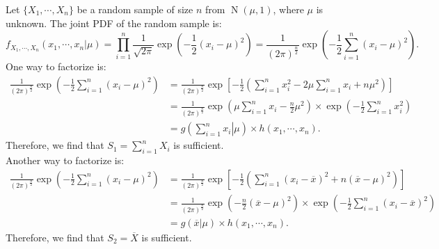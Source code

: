 \documentclass{huhtakm-template-book-v2}
\DeclareMathOperator{\N}{N}
\begin{document}
    \begin{eg}
        \label{Chapter 3 (Example) Sufficient statistic for normal distribution with unit variance}
        Let $\{X_{1}, \cdots, X_{n}\}$ be a random sample of size $n$ from $\N(\mu, 1)$, where $\mu$ is unknown. The joint PDF of the random sample is:
        \begin{equation*}
            f_{X_{1}, \cdots, X_{n}}(x_{1}, \cdots, x_{n} | \mu) = \prod_{i=1}^{n} \frac{1}{\sqrt{2\pi}} \exp\left(-\frac{1}{2}(x_{i} - \mu)^{2}\right) = \frac{1}{(2\pi)^{\frac{n}{2}}} \exp\left(-\frac{1}{2} \sum_{i=1}^{n} (x_{i} - \mu)^{2}\right).
        \end{equation*}
        One way to factorize is:
        \begin{align*}
            \frac{1}{(2\pi)^{\frac{n}{2}}} \exp\left(-\frac{1}{2} \sum_{i=1}^{n} (x_{i} - \mu)^{2}\right) &= \frac{1}{(2\pi)^{\frac{n}{2}}} \exp\left[-\frac{1}{2}\left(\sum_{i=1}^{n} x_{i}^{2} - 2\mu \sum_{i=1}^{n} x_{i} + n\mu^{2}\right)\right]\\
            &= \frac{1}{(2\pi)^{\frac{n}{2}}} \exp\left(\mu \sum_{i=1}^{n} x_{i} - \frac{n}{2}\mu^{2}\right) \times \exp\left(-\frac{1}{2} \sum_{i=1}^{n} x_{i}^{2}\right)\\
            &= g\left(\left.\sum_{i=1}^{n} x_{i}\right| \mu\right) \times h(x_{1}, \cdots, x_{n}).
        \end{align*}
        Therefore, we find that $S_{1} = \sum_{i=1}^{n} X_{i}$ is sufficient.\\
        Another way to factorize is:
        \begin{align*}
            \frac{1}{(2\pi)^{\frac{n}{2}}} \exp\left(-\frac{1}{2} \sum_{i=1}^{n} (x_{i} - \mu)^{2}\right) &= \frac{1}{(2\pi)^{\frac{n}{2}}} \exp\left[-\frac{1}{2}\left(\sum_{i=1}^{n} (x_{i} - \overline{x})^{2} + n(\overline{x} - \mu)^{2}\right)\right]\\
            &= \frac{1}{(2\pi)^{\frac{n}{2}}} \exp\left(-\frac{n}{2}(\overline{x} - \mu)^{2}\right) \times \exp\left(-\frac{1}{2} \sum_{i=1}^{n} (x_{i} - \overline{x})^{2}\right)\\
            &= g(\overline{x} | \mu) \times h(x_{1}, \cdots, x_{n}).
        \end{align*}
        Therefore, we find that $S_{2} = \overline{X}$ is sufficient.
    \end{eg}
    \newpage
    
\end{document}
